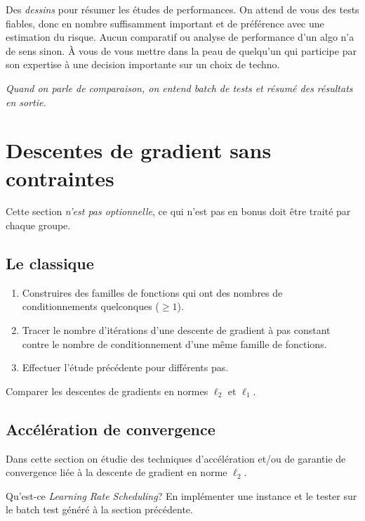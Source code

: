 \documentclass[11pt, a4paper]{article}
\begin{document}
Des \emph{dessins} pour résumer les études de performances. On attend
de vous des tests fiables, donc en nombre suffisamment important et de
préférence avec une estimation du risque. Aucun comparatif ou analyse
de performance d'un algo n'a de sens sinon. À vous de vous mettre dans
la peau de quelqu'un qui participe par son expertise à une decision
importante sur un choix de techno.

\vspace{\baselineskip}
\noindent \emph{Quand on parle de comparaison, on entend batch de
  tests et résumé des résultats en sortie.}

\section{Descentes de gradient sans contraintes}

Cette section \emph{n'est pas optionnelle}, ce qui n'est pas en bonus
doit être traité par chaque groupe.

\subsection{Le classique}

\begin{question}
  \begin{enumerate}
  \item Construires des familles de fonctions qui ont des nombres de
    conditionnements quelconques ($\geq 1$).
  \item Tracer le nombre d'itérations d'une descente de gradient à pas
    constant contre le nombre de conditionnement d'une même famille de
    fonctions.
  \item Effectuer l'étude précédente pour différents pas.
  \end{enumerate}
\end{question}

\begin{question}
  Comparer les descentes de gradients en normes $\ell_2$ et $\ell_1$.
\end{question}

\subsection{Accélération de convergence}

Dans cette section on étudie des techniques d'accélération et/ou de
garantie de convergence liée à la descente de gradient en norme
$\ell_2$.
\begin{question}
  Qu'est-ce \emph{Learning Rate Scheduling}? En implémenter une
  instance et le tester sur le batch test généré à la section
  précédente.
\end{question}
\end{document}

